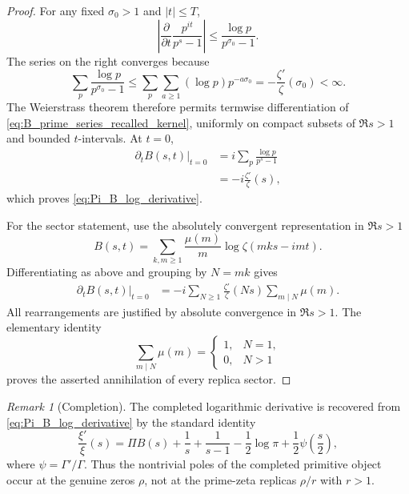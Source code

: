 \documentclass[11pt]{amsart}
\numberwithin{equation}{section}
\theoremstyle{plain}
\theoremstyle{definition}
\theoremstyle{remark}
\newtheorem{remark}[theorem]{Remark}
\begin{document}
\begin{proof}
For any fixed \(\sigma_0>1\) and \(|t|\le T\),
\begin{equation}
\left|\frac{\partial}{\partial t}
\frac{p^{it}}{p^s-1}\right|
\le \frac{\log p}{p^{\sigma_0}-1}.
\label{eq:B_t_derivative_majorant}
\end{equation}
The series on the right converges because
\begin{equation}
\sum_p\frac{\log p}{p^{\sigma_0}-1}
\le\sum_{p}\sum_{a\ge1}(\log p)p^{-a\sigma_0}
=-\frac{\zeta'}{\zeta}(\sigma_0)<\infty.
\label{eq:B_t_derivative_majorant_sum}
\end{equation}
The Weierstrass theorem therefore permits termwise differentiation of
\eqref{eq:B_prime_series_recalled_kernel}, uniformly on compact subsets of
\(\Re s>1\) and bounded \(t\)-intervals.  At \(t=0\),
\begin{align}
\left.\partial_t B(s,t)\right|_{t=0}
&=i\sum_p\frac{\log p}{p^s-1}
\label{eq:B_t_derivative_prime_sum}\\
&=-i\frac{\zeta'}{\zeta}(s),
\label{eq:B_t_derivative_logzeta_kernel}
\end{align}
which proves \eqref{eq:Pi_B_log_derivative}.

For the sector statement, use the absolutely convergent representation in
\(\Re s>1\)
\begin{equation}
B(s,t)=\sum_{k,m\ge1}\frac{\mu(m)}m
\log\zeta(mks-imt).
\label{eq:B_grouped_for_Pi}
\end{equation}
Differentiating as above and grouping by \(N=mk\) gives
\begin{align}
\left.\partial_tB(s,t)\right|_{t=0}
&=-i\sum_{N\ge1}\frac{\zeta'}{\zeta}(Ns)
\sum_{m\mid N}\mu(m).
\label{eq:Pi_grouped_mobius_sum}
\end{align}
All rearrangements are justified by absolute convergence in \(\Re s>1\).
The elementary identity
\begin{equation}
\sum_{m\mid N}\mu(m)=
\begin{cases}
1,&N=1,\\
0,&N>1
\end{cases}
\label{eq:mobius_primitive_projector}
\end{equation}
proves the asserted annihilation of every replica sector.
\end{proof}

\begin{remark}[Completion]
\label{rem:Pi_completion_xi}
The completed logarithmic derivative is recovered from
\eqref{eq:Pi_B_log_derivative} by the standard identity
\begin{equation}
\frac{\xi'}{\xi}(s)
=\Pi B(s)
+\frac1s+\frac1{s-1}
-\frac12\log\pi
+\frac12\psi\!\left(\frac{s}{2}\right),
\label{eq:xi_log_derivative_from_Pi}
\end{equation}
where \(\psi=\Gamma'/\Gamma\).  Thus the nontrivial poles of the completed
primitive object occur at the genuine zeros \(\rho\), not at the prime-zeta
replicas \(\rho/r\) with \(r>1\).
\end{remark}
\end{document}
